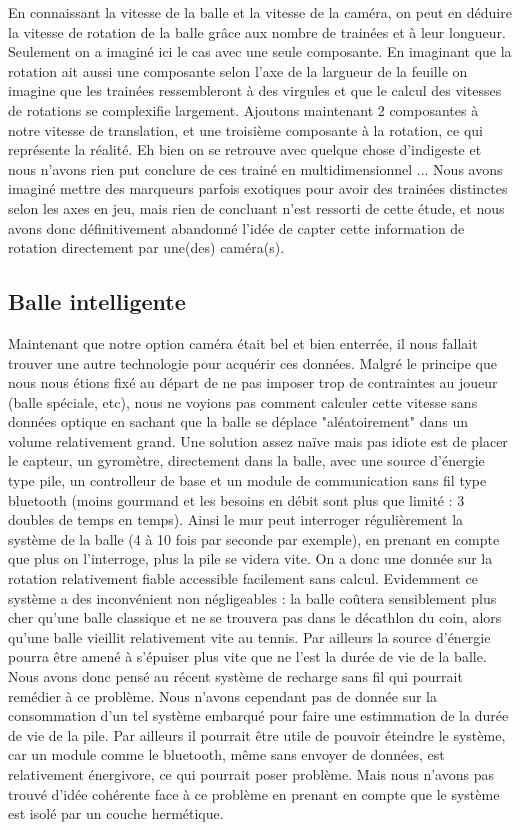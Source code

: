 
En connaissant la vitesse de la balle et la vitesse de la caméra, on peut en déduire la vitesse de rotation de la balle grâce aux nombre de trainées et à leur longueur. Seulement on a imaginé ici le cas avec une seule composante. En imaginant que la rotation ait aussi une composante selon l'axe de la largueur de la feuille on imagine que les trainées ressembleront à des virgules et que le calcul des vitesses de rotations se complexifie largement. Ajoutons maintenant 2 composantes à notre vitesse de translation, et une troisième composante à la rotation, ce qui représente la réalité. Eh bien on se retrouve avec quelque chose d'indigeste et nous n'avons rien put conclure de ces trainé en multidimensionnel ... Nous avons imaginé mettre des marqueurs parfois exotiques pour avoir des trainées distinctes selon les axes en jeu, mais rien de concluant n'est ressorti de cette étude, et nous avons donc définitivement abandonné l'idée de capter cette information de rotation directement par une(des) caméra(s).


\subsection{Balle intelligente}

Maintenant que notre option caméra était bel et bien enterrée, il nous fallait trouver une autre technologie pour acquérir ces données. Malgré le principe que nous nous étions fixé au départ de ne pas imposer trop de contraintes au joueur (balle spéciale, etc), nous ne voyions pas comment calculer cette vitesse sans données optique en sachant que la balle se déplace "aléatoirement" dans un volume relativement grand. Une solution assez naïve mais pas idiote est de placer le capteur, un gyromètre, directement dans la balle, avec une source d'énergie type pile, un controlleur de base et un module de communication sans fil type bluetooth (moins gourmand et les besoins en débit sont plus que limité : 3 doubles de temps en temps). Ainsi le mur peut interroger régulièrement la système de la balle (4 à 10 fois par seconde par exemple), en prenant en compte que plus on l'interroge, plus la pile se videra vite. On a donc une donnée sur la rotation relativement fiable accessible facilement sans calcul. Evidemment ce système a des inconvénient non négligeables : la balle coûtera sensiblement plus cher qu'une balle classique et ne se trouvera pas dans le décathlon du coin, alors qu'une balle vieillit relativement vite au tennis. Par ailleurs la source d'énergie pourra être amené à s'épuiser plus vite que ne l'est la durée de vie de la balle. Nous avons donc pensé au récent système de recharge sans fil qui pourrait remédier à ce problème. Nous n'avons cependant pas de donnée sur la consommation d'un tel système embarqué pour faire une estimmation de la durée de vie de la pile. Par ailleurs il pourrait être utile de pouvoir éteindre le système, car un module comme le bluetooth, même sans envoyer de données, est relativement énergivore, ce qui pourrait poser problème. Mais nous n'avons pas trouvé d'idée cohérente face à ce problème en prenant en compte que le système est isolé par un couche hermétique. \\

